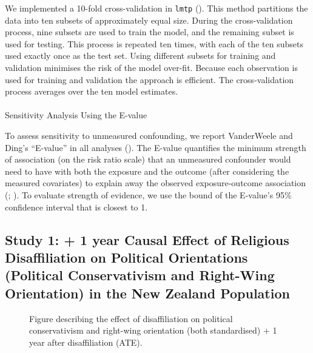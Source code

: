 \documentclass[
  singlecolumn]{article}
\makeatletter
\let\oldparagraph\paragraph
\renewcommand{\paragraph}{
    \@ifstar
      \xxxParagraphStar
      \xxxParagraphNoStar
  }
\newcommand{\xxxParagraphStar}[1]{\oldparagraph*{#1}\mbox{}}
\newcommand{\xxxParagraphNoStar}[1]{\oldparagraph{#1}\mbox{}}
\makeatother
\begin{document}
We implemented a 10-fold cross-validation in \texttt{lmtp}
(). This method
partitions the data into ten subsets of approximately equal size. During
the cross-validation process, nine subsets are used to train the model,
and the remaining subset is used for testing. This process is repeated
ten times, with each of the ten subsets used exactly once as the test
set. Using different subsets for training and validation minimises the
risk of the model over-fit. Because each observation is used for
training and validation the approach is efficient. The cross-validation
process averages over the ten model estimates.

\paragraph{Sensitivity Analysis Using the
E-value}\label{sensitivity-analysis-using-the-e-value}

To assess sensitivity to unmeasured confounding, we report VanderWeele
and Ding's ``E-value'' in all analyses
(). The E-value
quantifies the minimum strength of association (on the risk ratio scale)
that an unmeasured confounder would need to have with both the exposure
and the outcome (after considering the measured covariates) to explain
away the observed exposure-outcome association
(;
). To
evaluate strength of evidence, we use the bound of the E-value's 95\%
confidence interval that is closest to 1.

\newpage{}

\subsection{Study 1: + 1 year Causal Effect of Religious Disaffiliation
on Political Orientations (Political Conservativism and Right-Wing
Orientation) in the New Zealand
Population}\label{study-1-1-year-causal-effect-of-religious-disaffiliation-on-political-orientations-political-conservativism-and-right-wing-orientation-in-the-new-zealand-population}

\begin{figure}


\caption{\label{fig-ate}Figure describing the effect of disaffiliation
on political conservativism and right-wing orientation (both
standardised) + 1 year after disaffiliation (ATE).}

\end{figure}%
\end{document}
